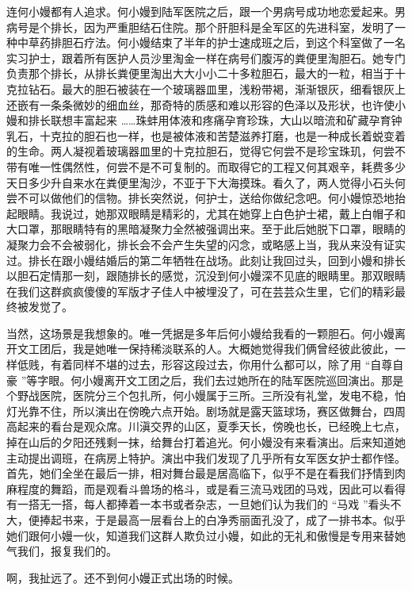 \documentclass[12pt,twoside,openany]{book}
\begin{document}
连何小嫚都有人追求。何小嫚到陆军医院之后，跟一个男病号成功地恋爱起来。男病号是个排长，因为严重胆结石住院。那个肝胆科是全军区的先进科室，发明了一种中草药排胆石疗法。何小嫚结束了半年的护士速成班之后，到这个科室做了一名实习护士，跟着所有医护人员沙里淘金一样在病号们腹泻的粪便里淘胆石。她专门负责那个排长，从排长粪便里淘出大大小小二十多粒胆石，最大的一粒，相当于十克拉钻石。最大的胆石被装在一个玻璃器皿里，浅粉带褐，渐渐银灰，细看银灰上还嵌有一条条微妙的细血丝，那奇特的质感和难以形容的色泽以及形状，也许使小嫚和排长联想丰富起来 ……珠蚌用体液和疼痛孕育珍珠，大山以暗流和矿藏孕育钟乳石，十克拉的胆石也一样，也是被体液和苦楚滋养打磨，也是一种成长着蜕变着的生命。两人凝视着玻璃器皿里的十克拉胆石，觉得它何尝不是珍宝珠玑，何尝不带有唯一性偶然性，何尝不是不可复制的。而取得它的工程又何其艰辛，耗费多少天日多少升自来水在粪便里淘沙，不亚于下大海摸珠。看久了，两人觉得小石头何尝不可以做他们的信物。排长突然说，何护士，送给你做纪念吧。何小嫚惊恐地抬起眼睛。我说过，她那双眼睛是精彩的，尤其在她穿上白色护士裙，戴上白帽子和大口罩，那眼睛特有的黑暗凝聚力全然被强调出来。至于此后她脱下口罩，眼睛的凝聚力会不会被弱化，排长会不会产生失望的闪念，或略感上当，我从来没有证实过。排长在跟小嫚结婚后的第二年牺牲在战场。此刻让我回过头，回到小嫚和排长以胆石定情那一刻，跟随排长的感觉，沉没到何小嫚深不见底的眼睛里。那双眼睛在我们这群疯疯傻傻的军版才子佳人中被埋没了，可在芸芸众生里，它们的精彩最终被发觉了。

当然，这场景是我想象的。唯一凭据是多年后何小嫚给我看的一颗胆石。何小嫚离开文工团后，我是她唯一保持稀淡联系的人。大概她觉得我们俩曾经彼此彼此，一样低贱，有着同样不堪的过去，形容这段过去，你用什么都可以，除了用 “自尊自豪 ”等字眼。何小嫚离开文工团之后，我们去过她所在的陆军医院巡回演出。那是个野战医院，医院分三个包扎所，何小嫚属于三所。三所没有礼堂，发电不稳，怕灯光靠不住，所以演出在傍晚六点开始。剧场就是露天篮球场，赛区做舞台，四周高起来的看台是观众席。川滇交界的山区，夏季天长，傍晚也长，已经晚上七点，掉在山后的夕阳还残剩一抹，给舞台打着追光。何小嫚没有来看演出。后来知道她主动提出调班，在病房上特护。演出中我们发现了几乎所有女军医女护士都作怪。首先，她们全坐在最后一排，相对舞台最是居高临下，似乎不是在看我们抒情到肉麻程度的舞蹈，而是观看斗兽场的格斗，或是看三流马戏团的马戏，因此可以看得有一搭无一搭，每人都捧着一本书或者杂志，一旦她们认为我们的 “马戏 ”看头不大，便捧起书来，于是最高一层看台上的白净秀丽面孔没了，成了一排书本。似乎她们跟何小嫚一伙，知道我们这群人欺负过小嫚，如此的无礼和傲慢是专用来替她气我们，报复我们的。

啊，我扯远了。还不到何小嫚正式出场的时候。
\end{document}

